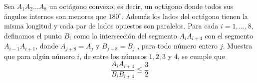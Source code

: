 Sea $A_1A_2 \dots A_8$ un octágono convexo, es decir, un octágono donde todos sus ángulos internos son menores que $180^{\circ}$. Además los lados del octágono tienen la misma longitud y cada par de lados opuestos son paralelos. Para cada $i = 1, \dots , 8$, definamos el punto $B_i$ como la intersección del segmento $A_iA_{i+4}$ con el segmento $A_{i−1}A_{i+1}$, donde $A_{j+8} = A_{j}$ y $B_{j+8} = B_j$ , para todo número entero $j$. Muestra que para algún número $i$, de entre los números $1, 2, 3$ y $4$, se cumple que
\[\frac{A_iA_{i+4}}{B_iB_{i+4}} \leq \frac{3}{2}\]